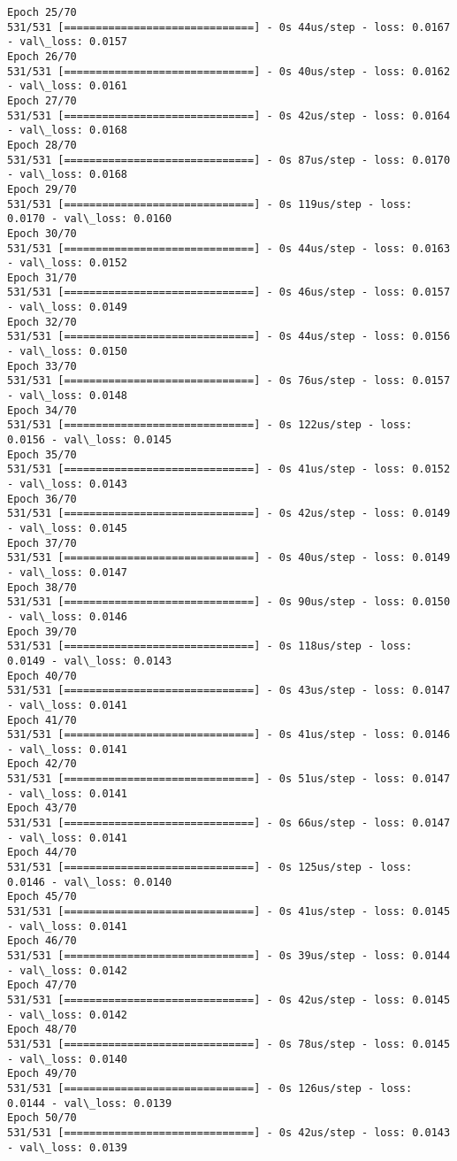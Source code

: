 \documentclass[11pt]{article}
\begin{document}
\begin{Verbatim}[commandchars=\\\{\}]
Epoch 25/70
531/531 [==============================] - 0s 44us/step - loss: 0.0167 - val\_loss: 0.0157
Epoch 26/70
531/531 [==============================] - 0s 40us/step - loss: 0.0162 - val\_loss: 0.0161
Epoch 27/70
531/531 [==============================] - 0s 42us/step - loss: 0.0164 - val\_loss: 0.0168
Epoch 28/70
531/531 [==============================] - 0s 87us/step - loss: 0.0170 - val\_loss: 0.0168
Epoch 29/70
531/531 [==============================] - 0s 119us/step - loss: 0.0170 - val\_loss: 0.0160
Epoch 30/70
531/531 [==============================] - 0s 44us/step - loss: 0.0163 - val\_loss: 0.0152
Epoch 31/70
531/531 [==============================] - 0s 46us/step - loss: 0.0157 - val\_loss: 0.0149
Epoch 32/70
531/531 [==============================] - 0s 44us/step - loss: 0.0156 - val\_loss: 0.0150
Epoch 33/70
531/531 [==============================] - 0s 76us/step - loss: 0.0157 - val\_loss: 0.0148
Epoch 34/70
531/531 [==============================] - 0s 122us/step - loss: 0.0156 - val\_loss: 0.0145
Epoch 35/70
531/531 [==============================] - 0s 41us/step - loss: 0.0152 - val\_loss: 0.0143
Epoch 36/70
531/531 [==============================] - 0s 42us/step - loss: 0.0149 - val\_loss: 0.0145
Epoch 37/70
531/531 [==============================] - 0s 40us/step - loss: 0.0149 - val\_loss: 0.0147
Epoch 38/70
531/531 [==============================] - 0s 90us/step - loss: 0.0150 - val\_loss: 0.0146
Epoch 39/70
531/531 [==============================] - 0s 118us/step - loss: 0.0149 - val\_loss: 0.0143
Epoch 40/70
531/531 [==============================] - 0s 43us/step - loss: 0.0147 - val\_loss: 0.0141
Epoch 41/70
531/531 [==============================] - 0s 41us/step - loss: 0.0146 - val\_loss: 0.0141
Epoch 42/70
531/531 [==============================] - 0s 51us/step - loss: 0.0147 - val\_loss: 0.0141
Epoch 43/70
531/531 [==============================] - 0s 66us/step - loss: 0.0147 - val\_loss: 0.0141
Epoch 44/70
531/531 [==============================] - 0s 125us/step - loss: 0.0146 - val\_loss: 0.0140
Epoch 45/70
531/531 [==============================] - 0s 41us/step - loss: 0.0145 - val\_loss: 0.0141
Epoch 46/70
531/531 [==============================] - 0s 39us/step - loss: 0.0144 - val\_loss: 0.0142
Epoch 47/70
531/531 [==============================] - 0s 42us/step - loss: 0.0145 - val\_loss: 0.0142
Epoch 48/70
531/531 [==============================] - 0s 78us/step - loss: 0.0145 - val\_loss: 0.0140
Epoch 49/70
531/531 [==============================] - 0s 126us/step - loss: 0.0144 - val\_loss: 0.0139
Epoch 50/70
531/531 [==============================] - 0s 42us/step - loss: 0.0143 - val\_loss: 0.0139

\end{Verbatim}
\end{document}
